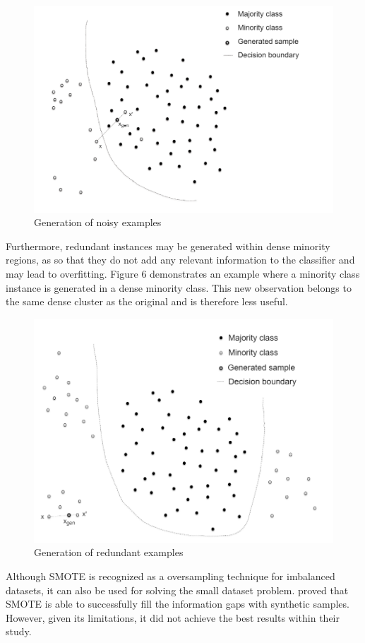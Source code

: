 \documentclass[parskip=full]{scrartcl}
\begin{document}
\begin{figure}[H]
	\centering
	\includegraphics[width=0.6\linewidth]{./resources/noisy_examples}
	\caption{Generation of noisy examples \cite{Douzas.2019b}}
	\label{fig:noisy-examples}
\end{figure}

Furthermore, redundant instances may be generated within dense minority 
regions, as so that they do not add any relevant information to the classifier 
and may lead to overfitting. Figure 6 demonstrates an example where a minority 
class instance is generated in a dense minority class. This new observation 
belongs to the same dense cluster as the original and is therefore less useful. 

\begin{figure}[H]
	\centering
	\includegraphics[width=0.6\linewidth]{./resources/redundant_examples}
	\caption{Generation of redundant examples \cite{Douzas.2019b}}
	\label{fig:redundant-examples}
\end{figure}

Although SMOTE is recognized as a oversampling technique for imbalanced
datasets, it can also be used for solving the small dataset problem. 
\cite{Li.2018} proved that SMOTE is able to successfully fill the information 
gaps with synthetic samples. However, given its limitations, it did not achieve 
the best results within their study.
\end{document}
